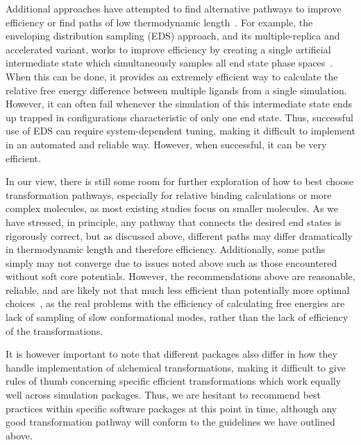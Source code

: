 \documentclass[9pt,bestpractices]{livecoms}
\begin{document}
Additional approaches have attempted to find alternative pathways to improve efficiency or find paths of low thermodynamic length~\cite{naden2014linear,naden2015linear,pham2012optimal}. For example, the enveloping distribution sampling (EDS) approach, and its multiple-replica and accelerated variant, works to improve efficiency by creating a single artificial intermediate state which simultaneously samples all end state phase spaces~\cite{perthold2018accelerated,sidler2017efficient, christ2007enveloping}. When this can be done, it provides an extremely efficient way to calculate the relative free energy difference between multiple ligands from a single simulation. However, it can often fail whenever the simulation of this intermediate state ends up trapped in configurations characteristic of only one end state. Thus, successful use of EDS can require system-dependent tuning, making it difficult to implement in an automated and reliable way. However, when successful, it can be very efficient.


In our view, there is still some room for further exploration of how to best choose transformation pathways, especially for relative binding calculations or more complex molecules, as most existing studies focus on smaller molecules. As we have stressed, in principle, any pathway that connects the desired end states is rigorously correct, but as discussed above, different paths may differ dramatically in thermodynamic length and therefore efficiency. Additionally, some paths simply may not converge due to issues noted above such as those encountered without soft core potentials. However, the recommendations above are reasonable, reliable, and are likely not that much less efficient than potentially more optimal choices~\cite{naden2014linear,naden2015linear,pham2012optimal}, as the real problems with the efficiency of calculating free energies are lack of sampling of slow conformational modes, rather than the lack of efficiency of the transformations. 

It is however important to note that different packages also differ in how they handle implementation of alchemical transformations, making it difficult to give rules of thumb concerning specific efficient transformations which work equally well across simulation packages. Thus, we are hesitant to recommend best practices within specific software packages at this point in time, although any good transformation pathway will conform to the guidelines we have outlined above.
\end{document}
